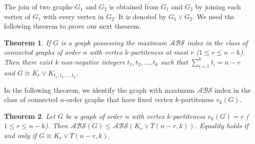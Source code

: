\documentclass[12pt]{article}
\newtheorem{theorem}{Theorem}[section]
\begin{document}
 The join of two graphs $G_{1}$ and $G_{2}$ is obtained from $G_{1}$ and $G_{2}$ by joining each vertex of $G_{1}$ with every vertex in $G_{2}$. It is denoted by $G_{1}\vee G_{2}$. We need the following theorem to prove our next theorem.
\begin{theorem}\rm\cite{gao2018graphs,ali2024extremal}\label{kpartiteness th}
If $G$ is a graph possessing the maximum $\mathcal{ABS}$ index in the class of  connected graphs of order $n$ with vertex $k$-partiteness at most $r$ ($1\le r\le n-k$). Then there exist $k$ non-negative integers $t_1,t_2,\dots,t_k$ such that $\sum\limits_{i=1}^k t_i=n-r$ and $G\cong K_r\vee K_{t_1,t_2,\dots,t_k}$.
\end{theorem}

In the following theorem, we identify the graph with maximum $\mathcal{ABS}$ index in the class of connected $n$-order graphs that have fixed vertex $k$-partiteness $v_{k}(G)$. 
\begin{theorem}\label{KPAR}
Let $G$ be a graph of order $n$ with vertex $k$-partiteness $v_{k}(G)=r$ ($1\le r\le n-k$). Then $\mathcal{ABS}(G)\le \mathcal{ABS}(K_{r}\vee T(n-r,k))$. Equality holds if and only if $G\cong K_{r}\vee T(n-r,k)$.
\end{theorem}
\end{document}
